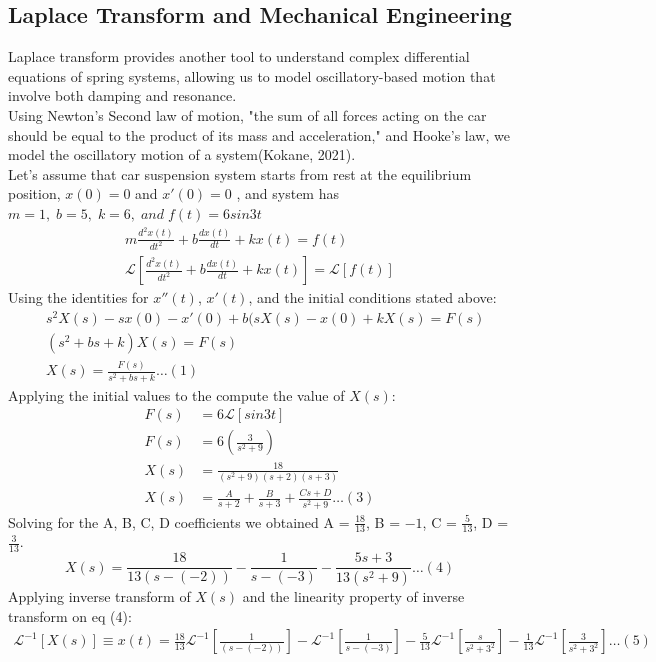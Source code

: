 \documentclass[12pt]{article}
\theoremstyle{plain}
\theoremstyle{definition}
\begin{document}
\subsection{Laplace Transform and Mechanical Engineering}
Laplace transform provides another tool to understand complex differential equations of spring systems, allowing us to model oscillatory-based motion that involve both damping and resonance.\\
Using Newton's Second law of motion, "the sum of all forces acting on the car should be equal to the product of its mass and acceleration," and  Hooke's law, we model the oscillatory motion of a system(Kokane, 2021). 
\\
Let's assume that car suspension system starts from rest at the equilibrium position,  $x(0) = 0$ and $x'(0) = 0$ , and  system has  $m = 1,\; b= 5,\; k = 6,\; and\; f(t) = 6 sin 3t$
\begin{align*}
m\frac{d^2x(t) }{dt^2}+b\frac{dx(t)}{dt}+kx(t) = f(t)\\
\mathcal{L}\left[\frac{d^2x(t) }{dt^2}+b\frac{dx(t)}{dt}+kx(t)\right]= \mathcal{L}[f(t)]
\end{align*}
Using the identities for $x''(t)$, $x'(t)$, and the initial conditions stated above:
\begin{align*}
&s^2X(s) -sx(0) -x'(0)+ b(sX(s) -x(0)+ kX(s) = F(s)\\
&(s^2+bs+k)X(s)=F(s)\\
&X(s) = \frac {F(s)}{s^2+bs+k} \dots(1)
\end{align*}
Applying the initial values to the compute the value of $X(s)$:
\begin{align*}
F(s) &= 6\mathcal{L}\left[sin3t\right]\\
F(s) &= 6\left(\frac{3}{s^2 + 9}\right)\\
X(s)& =\frac{18}{(s^2+9)(s+2)(s+3)}\\
{X}(s)&= \frac{A}{s+2} + \frac{B}{s+3} + \frac{Cs + D}{s^2+9}\dots (3)
\end{align*}
Solving \; for\; the A, B, C, D coefficients we obtained A = $\frac{18}{13}$,  B = $-1$, C = $\frac{5}{13}$, D = $\frac{3}{13}$. 
\begin{equation*}
X(s)= \frac{18}{13(s-(-2))} - \frac{1}{s-(-3)} - \frac{5s + 3}{13(s^2+9)} \dots(4)
\end{equation*}
Applying inverse transform of $X(s)$ and the linearity property of inverse transform on eq (4):
\begin{align*}
\mathcal{L}^{-1}[{X}(s) ] \equiv x(t) = \frac{18}{13}\mathcal{L}^{-1} \left[\frac{1}{(s-(-2))}\right] -\mathcal{L}^{-1} \left[\frac{1}{s-(-3)}\right] - \frac{5}{13}\mathcal{L}^{-1} \left[\frac{s}{s^2+3^2}\right] - \frac{1}{13}\mathcal{L}^{-1} \left[\frac{ 3}{s^2+3^2}\right] \dots (5)
\end{align*}
\end{document}
